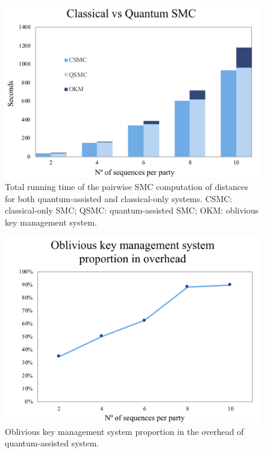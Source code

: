\begin{figure}
    \centering
    \includegraphics[scale=0.8]{Chapter_PrivatePhylogeneticTrees/c-qSMC.png}
    \caption{Total running time of the pairwise SMC computation of distances for both quantum-assisted and classical-only systems. CSMC: classical-only SMC; QSMC: quantum-assisted SMC; OKM: oblivious key management system.}
    \label{fig:okms}
\end{figure}

\begin{figure}
    \centering
    \includegraphics[scale=0.8]{Chapter_PrivatePhylogeneticTrees/proportion_in_overhead.png}
    \caption{Oblivious key management system proportion in the overhead of quantum-assisted system.}
    \label{fig:overhead}
\end{figure}

